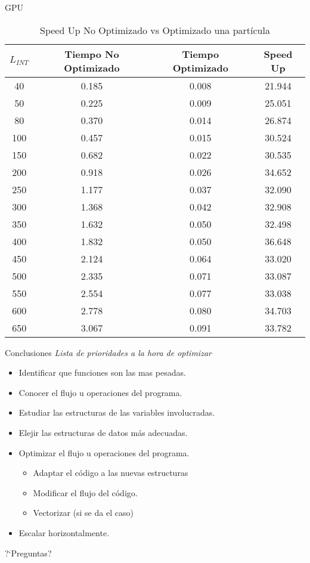 \documentclass{beamer}
\begin{document}
\begin{frame}{GPU}{}
  \begin{table}[H]
\begin{center}

\small
\begin{tabular}{ |c|c|c|c| }
  \hline
  $L_{INT}$ & Tiempo No Optimizado & Tiempo Optimizado & Speed Up \\
  \hline
  40 & 0.185 & 0.008 & 21.944\\
  50 & 0.225 & 0.009 & 25.051\\
  80 & 0.370 & 0.014 & 26.874\\
  100 & 0.457 & 0.015 & 30.524\\
  150 & 0.682 & 0.022 & 30.535\\
  200 & 0.918 & 0.026 & 34.652\\
  250 & 1.177 & 0.037 & 32.090\\
  300 & 1.368 & 0.042 & 32.908\\
  350 & 1.632 & 0.050 & 32.498\\
  400 & 1.832 & 0.050 & 36.648\\
  450 & 2.124 & 0.064 & 33.020\\
  500 & 2.335 & 0.071 & 33.087\\
  550 & 2.554 & 0.077 & 33.038\\
  600 & 2.778 & 0.080 & 34.703\\
  650 & 3.067 & 0.091 & 33.782\\
  \hline
\end{tabular}
\caption{Speed Up No Optimizado vs Optimizado una part\'icula}
\label{table:speedup1par}
\end{center}
\end{table}
\end{frame}

\begin{frame}{Conclusiones}{}
  \textit{Lista de prioridades a la hora de optimizar}
  \begin{itemize}
    \item Identificar que funciones son las mas pesadas.
    \item Conocer el flujo u operaciones del programa.
    \item Estudiar las estructuras de las variables involucradas.
    \item Elejir las estructuras de datos m\'as adecuadas.
    \item Optimizar el flujo u operaciones del programa.
      \begin{itemize}
        \item Adaptar el c\'odigo a las nuevas estructuras
        \item Modificar el flujo del c\'odigo.
        \item Vectorizar (si se da el caso)
      \end{itemize}
    \item Escalar horizontalmente.
  \end{itemize}
\end{frame}

\begin{frame}{?`Preguntas?}{}
\end{frame}
\end{document}
